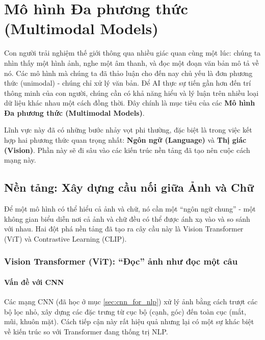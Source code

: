 
\section{Mô hình Đa phương thức (Multimodal Models)}
\label{sec:multimodal_models}

Con người trải nghiệm thế giới thông qua nhiều giác quan cùng một lúc: chúng ta nhìn thấy một hình ảnh, nghe một âm thanh, và đọc một đoạn văn bản mô tả về nó. Các mô hình mà chúng ta đã thảo luận cho đến nay chủ yếu là đơn phương thức (unimodal) - chúng chỉ xử lý văn bản. Để AI thực sự tiến gần hơn đến trí thông minh của con người, chúng cần có khả năng hiểu và lý luận trên nhiều loại dữ liệu khác nhau một cách đồng thời. Đây chính là mục tiêu của các \textbf{Mô hình Đa phương thức (Multimodal Models)}.

Lĩnh vực này đã có những bước nhảy vọt phi thường, đặc biệt là trong việc kết hợp hai phương thức quan trọng nhất: \textbf{Ngôn ngữ (Language)} và \textbf{Thị giác (Vision)}. Phần này sẽ đi sâu vào các kiến trúc nền tảng đã tạo nên cuộc cách mạng này.

\subsection{Nền tảng: Xây dựng cầu nối giữa Ảnh và Chữ}
\label{ssec:multimodal_foundations}

Để một mô hình có thể hiểu cả ảnh và chữ, nó cần một “ngôn ngữ chung” - một không gian biểu diễn nơi cả ảnh và chữ đều có thể được ánh xạ vào và so sánh với nhau. Hai đột phá nền tảng đã tạo ra cây cầu này là Vision Transformer (ViT) và Contrastive Learning (CLIP).

\subsubsection{Vision Transformer (ViT): “Đọc” ảnh như đọc một câu}
\paragraph{Vấn đề với CNN}
Các mạng CNN (đã học ở mục \ref{sec:cnn_for_nlp}) xử lý ảnh bằng cách trượt các bộ lọc nhỏ, xây dựng các đặc trưng từ cục bộ (cạnh, góc) đến toàn cục (mắt, mũi, khuôn mặt). Cách tiếp cận này rất hiệu quả nhưng lại có một sự khác biệt về kiến trúc so với Transformer đang thống trị NLP.

